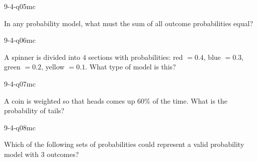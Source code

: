 \begin{practiceQuestion}{9-4-q05}{mc}
\begin{questionText}
In any probability model, what must the sum of all outcome probabilities equal?
\end{questionText}
\end{practiceQuestion}

\begin{practiceQuestion}{9-4-q06}{mc}
\begin{questionText}
A spinner is divided into $4$ sections with probabilities: red $= 0.4$, blue $= 0.3$, green $= 0.2$, yellow $= 0.1$. What type of model is this?
\end{questionText}
\end{practiceQuestion}

\begin{practiceQuestion}{9-4-q07}{mc}
\begin{questionText}
A coin is weighted so that heads comes up $60\%$ of the time. What is the probability of tails?
\end{questionText}
\end{practiceQuestion}

\begin{practiceQuestion}{9-4-q08}{mc}
\begin{questionText}
Which of the following sets of probabilities could represent a valid probability model with $3$ outcomes?
\end{questionText}
\end{practiceQuestion}

